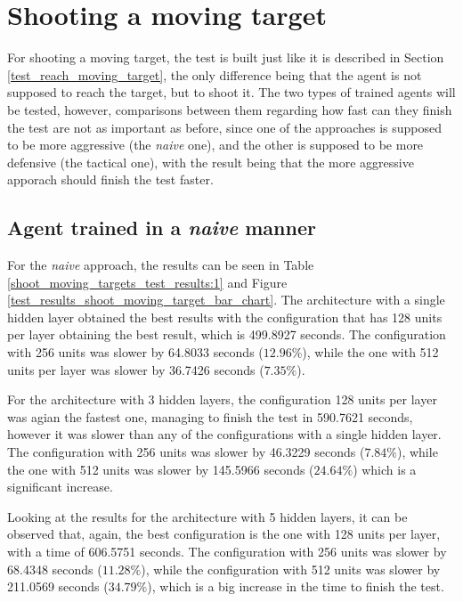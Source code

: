 \section{Shooting a moving target} \label{test_shoot_moving_target}

For shooting a moving target, the test is built just like it is described in Section \ref{test_reach_moving_target}, the only difference being that the agent is not supposed to reach the target, but to shoot it. The two types of trained agents will be tested, however, comparisons between them regarding how fast can they finish the test are not as important as before, since one of the approaches is supposed to be more aggressive (the \emph{naive} one), and the other is supposed to be more defensive (the tactical one), with the result being that the more aggressive apporach should finish the test faster.

\subsection{Agent trained in a \emph{naive} manner}

For the \emph{naive} approach, the results can be seen in Table \ref{shoot_moving_targets_test_results:1} and Figure \ref{test_results_shoot_moving_target_bar_chart}. The architecture with a single hidden layer obtained the best results with the configuration that has 128 units per layer obtaining the best result, which is 499.8927 seconds. The configuration with 256 units was slower by 64.8033 seconds ($12.96\%$), while the one with 512 units per layer was slower by 36.7426 seconds ($7.35\%$).

For the architecture with 3 hidden layers, the configuration 128 units per layer was agian the fastest one, managing to finish the test in 590.7621 seconds, however it was slower than any of the configurations with a single hidden layer. The configuration with 256 units was slower by 46.3229 seconds ($7.84\%$), while the one with 512 units was slower by 145.5966 seconds ($24.64\%$) which is a significant increase.

Looking at the results for the architecture with 5 hidden layers, it can be observed that, again, the best configuration is the one with 128 units per layer, with a time of 606.5751 seconds. The configuration with 256 units was slower by 68.4348 seconds ($11.28\%$), while the configuration with 512 units was slower by 211.0569 seconds ($34.79\%$), which is a big increase in the time to finish the test.

